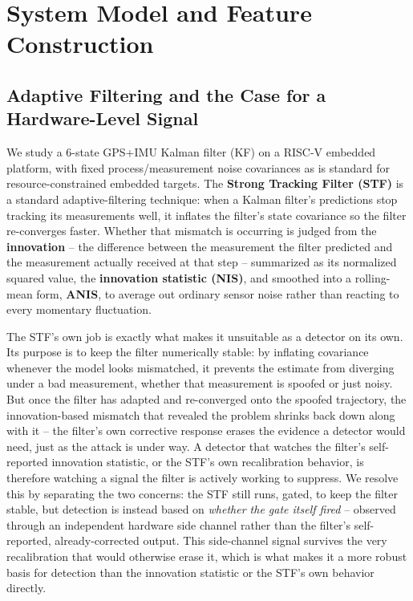\documentclass[conference]{IEEEtran}
\begin{document}
\section{System Model and Feature Construction}
\label{sec:system}

\subsection{Adaptive Filtering and the Case for a Hardware-Level Signal}
\label{sec:stf-rationale}

We study a 6-state GPS+IMU Kalman filter (KF) on a RISC-V embedded platform, with fixed process/measurement noise covariances as is standard for resource-constrained embedded targets. The \textbf{Strong Tracking Filter (STF)} is a standard adaptive-filtering technique: when a Kalman filter's predictions stop tracking its measurements well, it inflates the filter's state covariance so the filter re-converges faster. Whether that mismatch is occurring is judged from the \textbf{innovation} -- the difference between the measurement the filter predicted and the measurement actually received at that step -- summarized as its normalized squared value, the \textbf{innovation statistic (NIS)}, and smoothed into a rolling-mean form, \textbf{ANIS}, to average out ordinary sensor noise rather than reacting to every momentary fluctuation.

The STF's own job is exactly what makes it unsuitable as a detector on its own. Its purpose is to keep the filter numerically stable: by inflating covariance whenever the model looks mismatched, it prevents the estimate from diverging under a bad measurement, whether that measurement is spoofed or just noisy. But once the filter has adapted and re-converged onto the spoofed trajectory, the innovation-based mismatch that revealed the problem shrinks back down along with it -- the filter's own corrective response erases the evidence a detector would need, just as the attack is under way. A detector that watches the filter's self-reported innovation statistic, or the STF's own recalibration behavior, is therefore watching a signal the filter is actively working to suppress. We resolve this by separating the two concerns: the STF still runs, gated, to keep the filter stable, but detection is instead based on \emph{whether the gate itself fired} -- observed through an independent hardware side channel rather than the filter's self-reported, already-corrected output. This side-channel signal survives the very recalibration that would otherwise erase it, which is what makes it a more robust basis for detection than the innovation statistic or the STF's own behavior directly.
\end{document}
